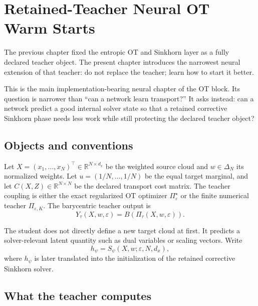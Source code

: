 \chapter{Retained-Teacher Neural OT Warm Starts}
\label{ch:bf-dpf-learned-ot}

The previous chapter fixed the entropic OT and Sinkhorn layer as a fully declared
teacher object.  The present chapter introduces the narrowest neural extension of
that teacher: do not replace the teacher; learn how to start it better.

This is the main implementation-bearing neural chapter of the OT block.  Its
question is narrower than ``can a network learn transport?''  It asks instead:
can a network predict a good internal solver state so that a retained corrective
Sinkhorn phase needs less work while still protecting the declared teacher object?

\section{Objects and conventions}
\label{sec:bf-learned-ot-objects}

Let \(X=(x_1,\ldots,x_N)^\top\in\mathbb R^{N\times d_x}\) be the weighted source
cloud and \(w\in\Delta_N\) its normalized weights.  Let
\(u=(1/N,\ldots,1/N)\) be the equal target marginal, and let
\(C(X,Z)\in\mathbb R^{N\times N}\) be the declared transport cost matrix.  The
teacher coupling is either the exact regularized OT optimizer
\(\Pi_\varepsilon^\star\) or the finite numerical teacher
\(\Pi_{\varepsilon,K}\).  The barycentric teacher output is
\begin{equation}
\label{eq:bf-learned-ot-barycentric-teacher}
  Y_\tau(X,w,\varepsilon)=B(\Pi_\tau(X,w,\varepsilon)).
\end{equation}

The student does not directly define a new target cloud at first.  It predicts a
solver-relevant latent quantity such as dual variables or scaling vectors.  Write
\begin{equation}
\label{eq:bf-learned-ot-student-map}
  h_\psi = S_\psi(X,w;\varepsilon,N,d_x),
\end{equation}
where \(h_\psi\) is later translated into the initialization of the retained
corrective Sinkhorn solver.

\section{What the teacher computes}
\label{sec:bf-learned-ot-hierarchy}

